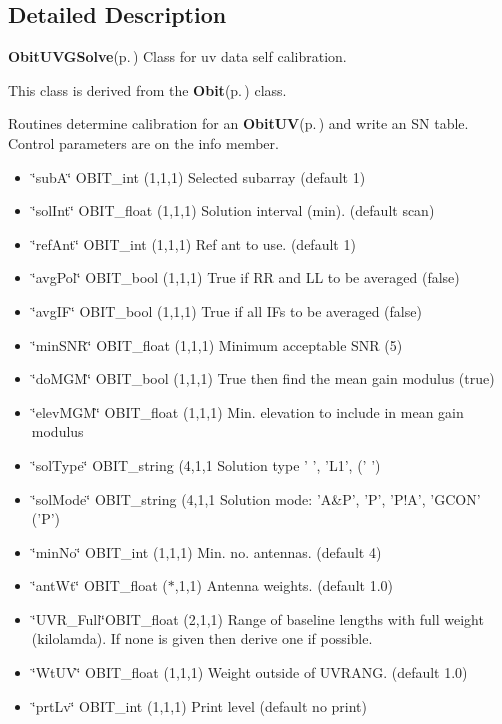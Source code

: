 \subsection{Detailed Description}
{\bf Obit\-UVGSolve}{\rm (p.\,\pageref{structObitUVGSolve})} Class for uv data self calibration. 

This class is derived from the {\bf Obit}{\rm (p.\,\pageref{structObit})} class.

Routines determine calibration for an {\bf Obit\-UV}{\rm (p.\,\pageref{structObitUV})} and write an SN table. Control parameters are on the info member. \begin{itemize}
\item \char`\"{}sub\-A\char`\"{} OBIT\_\-int (1,1,1) Selected subarray (default 1) \item \char`\"{}sol\-Int\char`\"{} OBIT\_\-float (1,1,1) Solution interval (min). (default scan) \item \char`\"{}ref\-Ant\char`\"{} OBIT\_\-int (1,1,1) Ref ant to use. (default 1) \item \char`\"{}avg\-Pol\char`\"{} OBIT\_\-bool (1,1,1) True if RR and LL to be averaged (false) \item \char`\"{}avg\-IF\char`\"{} OBIT\_\-bool (1,1,1) True if all IFs to be averaged (false) \item \char`\"{}min\-SNR\char`\"{} OBIT\_\-float (1,1,1) Minimum acceptable SNR (5) \item \char`\"{}do\-MGM\char`\"{} OBIT\_\-bool (1,1,1) True then find the mean gain modulus (true) \item \char`\"{}elev\-MGM\char`\"{} OBIT\_\-float (1,1,1) Min. elevation to include in mean gain modulus \item \char`\"{}sol\-Type\char`\"{} OBIT\_\-string (4,1,1 Solution type ' ', 'L1', (' ') \item \char`\"{}sol\-Mode\char`\"{} OBIT\_\-string (4,1,1 Solution mode: 'A\&P', 'P', 'P!A', 'GCON' ('P') \item \char`\"{}min\-No\char`\"{} OBIT\_\-int (1,1,1) Min. no. antennas. (default 4) \item \char`\"{}ant\-Wt\char`\"{} OBIT\_\-float ($\ast$,1,1) Antenna weights. (default 1.0) \item \char`\"{}UVR\_\-Full\char`\"{}OBIT\_\-float (2,1,1) Range of baseline lengths with full weight (kilolamda). If none is given then derive one if possible. \item \char`\"{}Wt\-UV\char`\"{} OBIT\_\-float (1,1,1) Weight outside of UVRANG. (default 1.0) \item \char`\"{}prt\-Lv\char`\"{} OBIT\_\-int (1,1,1) Print level (default no print)\end{itemize}
